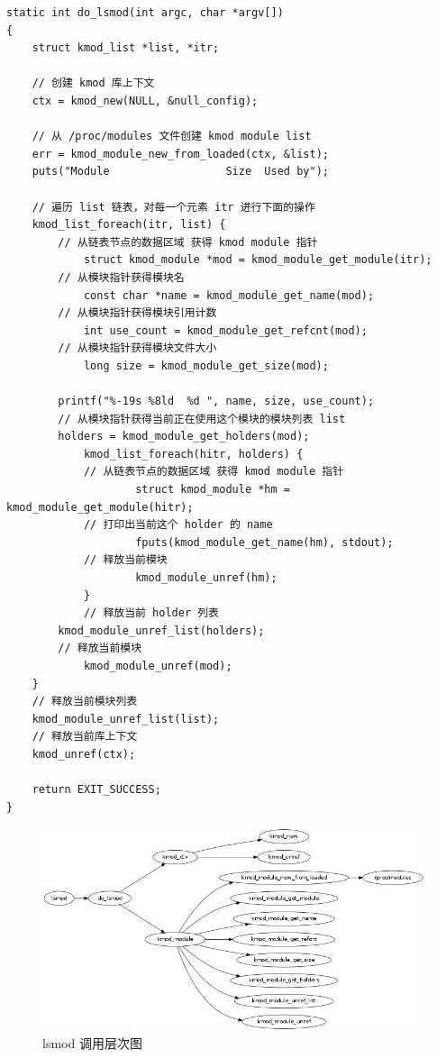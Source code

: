 \documentclass[11pt,a4paper]{article}
\makeatletter
\def\maxwidth{\ifdim\Gin@nat@width>\linewidth\linewidth
\else\Gin@nat@width\fi}
\let\Oldincludegraphics\includegraphics
\renewcommand{\includegraphics}[1]{\Oldincludegraphics[width=\maxwidth]{#1}}
\makeatother
\begin{document}
{\begin{shaded}\begin{verbatim}
static int do_lsmod(int argc, char *argv[])
{
    struct kmod_list *list, *itr;

    // 创建 kmod 库上下文
    ctx = kmod_new(NULL, &null_config);

    // 从 /proc/modules 文件创建 kmod module list    
    err = kmod_module_new_from_loaded(ctx, &list);
    puts("Module                  Size  Used by");

    // 遍历 list 链表，对每一个元素 itr 进行下面的操作
    kmod_list_foreach(itr, list) {
        // 从链表节点的数据区域 获得 kmod module 指针
            struct kmod_module *mod = kmod_module_get_module(itr);
        // 从模块指针获得模块名
            const char *name = kmod_module_get_name(mod);
        // 从模块指针获得模块引用计数
            int use_count = kmod_module_get_refcnt(mod);
        // 从模块指针获得模块文件大小
            long size = kmod_module_get_size(mod);

        printf("%-19s %8ld  %d ", name, size, use_count);
        // 从模块指针获得当前正在使用这个模块的模块列表 list
        holders = kmod_module_get_holders(mod);
            kmod_list_foreach(hitr, holders) {
            // 从链表节点的数据区域 获得 kmod module 指针
                    struct kmod_module *hm = kmod_module_get_module(hitr);
            // 打印出当前这个 holder 的 name 
                    fputs(kmod_module_get_name(hm), stdout);
            // 释放当前模块
                    kmod_module_unref(hm);
            }
            // 释放当前 holder 列表
        kmod_module_unref_list(holders);
        // 释放当前模块
            kmod_module_unref(mod);
    }
    // 释放当前模块列表
    kmod_module_unref_list(list);
    // 释放当前库上下文
    kmod_unref(ctx);

    return EXIT_SUCCESS;
}
\end{verbatim}\end{shaded}}
\begin{figure}[htbp]
\centering
\includegraphics{./figures/lsmod.jpg}
\caption{lsmod 调用层次图}
\end{figure}
\end{document}
